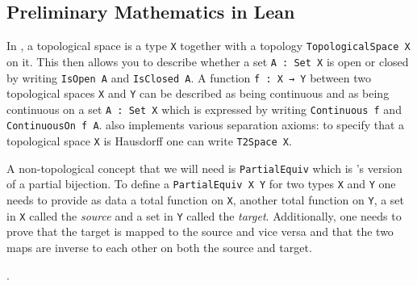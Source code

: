 \subsection{Preliminary Mathematics in Lean}\label{sub:mathinlean}

In \mathlib, a topological space is a type \lstinline|X| together with a topology \lstinline|TopologicalSpace X| on it.
This then allows you to describe whether a set \lstinline|A : Set X| is open or closed by writing \lstinline|IsOpen A| and \lstinline|IsClosed A|. 
A function \lstinline|f : X → Y| between two topological spaces \lstinline|X| and \lstinline|Y| can be described as being continuous and as being continuous on a set \lstinline|A : Set X| which is expressed by writing \lstinline|Continuous f| and \lstinline|ContinuousOn f A|. 
\mathlib also implements various separation axioms: to specify that a topological space \lstinline|X| is Hausdorff one can write \lstinline|T2Space X|.

A non-topological concept that we will need is \lstinline|PartialEquiv| which is \mathlib's version of a partial bijection. 
To define a \lstinline|PartialEquiv X Y| for two types \lstinline|X| and \lstinline|Y| one needs to provide as data a total function on \lstinline|X|, another total function on \lstinline|Y|, a set in \lstinline|X| called the \emph{source} and a set in \lstinline|Y| called the \emph{target}. 
Additionally, one needs to prove that the target is mapped to the source and vice versa and that the two maps are inverse to each other on both the source and target. 

.
